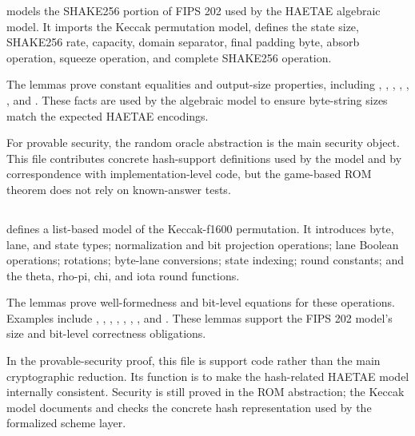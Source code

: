  models the SHAKE256 portion of FIPS 202 used by the
HAETAE algebraic model.  It imports the Keccak permutation model, defines the
state size, SHAKE256 rate, capacity, domain separator, final padding byte,
absorb operation, squeeze operation, and complete SHAKE256 operation.

The lemmas prove constant equalities and output-size properties, including
, ,
,
,
,
, and .  These facts are
used by the algebraic model to ensure byte-string sizes match the expected
HAETAE encodings.

For provable security, the random oracle abstraction is the main security
object.  This file contributes concrete hash-support definitions used by the
model and by correspondence with implementation-level code, but the game-based
ROM theorem does not rely on known-answer tests.

\subsection[HAETAE\_Keccak1600.ec]{\texorpdfstring{}{HAETAE\_Keccak1600.ec}}

 defines a list-based model of the Keccak-f1600
permutation.  It introduces byte, lane, and state types; normalization and bit
projection operations; lane Boolean operations; rotations; byte-lane
conversions; state indexing; round constants; and the theta, rho-pi, chi, and
iota round functions.

The lemmas prove well-formedness and bit-level equations for these operations.
Examples include ,
, ,
, ,
, , and
.  These lemmas support the FIPS 202 model's size and
bit-level correctness obligations.

In the provable-security proof, this file is support code rather than the main
cryptographic reduction.  Its function is to make the hash-related HAETAE model
internally consistent.  Security is still proved in the ROM abstraction; the
Keccak model documents and checks the concrete hash representation used by the
formalized scheme layer.

